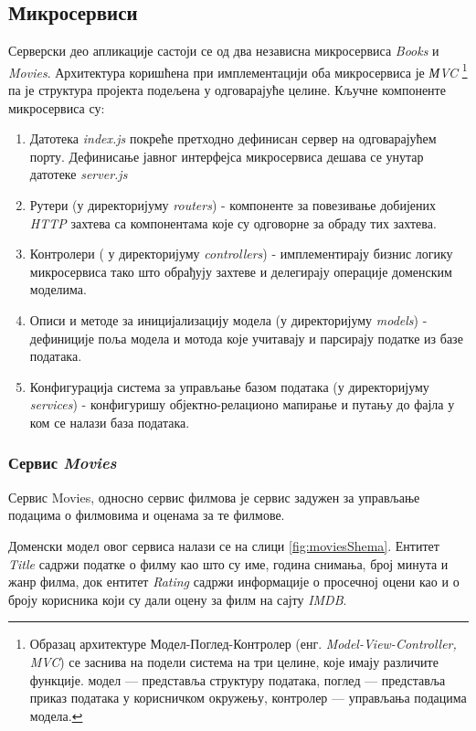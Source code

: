 \documentclass[12pt,oneside]{memoir}
\begin{document}
\subsection{Микросервиси}

Серверски део апликације састоји се од два независна микросервиса \textit{Books} и \textit{Movies}. Архитектура коришћена при имплементацији оба микросервиса је \textit{МVC} \footnote{Образац архитектуре Модел-Поглед-Контролер (енг. \textit{Model-View-Controller, MVC})
се заснива на подели система на три целине, које имају различите функције. модел — представља структуру података, поглед — представља приказ података у корисничком окружењу, контролер — управљања подацима модела.} па је структура пројекта подељена у одговарајуће целине.
Кључне компоненте микросервиса су:

\begin{enumerate}
\item Датотека \textit{index.js} покреће претходно дефинисан сервер на одговарајућем порту. Дефинисање јавног интерфејса микросервиса дешава се унутар датотеке \textit{server.js}
\item Рутери (у директоријуму \textit{routers}) - компоненте за повезивање добијених \textit{HTTP} захтева са компонентама које су одговорне за обраду тих захтева.
\item Контролери ( у директоријуму \textit{controllers}) - имплементирају бизнис логику микросервиса тако што обрађују захтеве и делегирају операције доменским моделима.
\item Описи и методе за иницијализацију модела (у директоријуму \textit{models}) -  дефиниције поља модела и мотода које учитавају и парсирају податке из базе података.
\item Конфигурација  система за управљање базом података (у директоријуму \textit{services}) - конфигуришу објектно-релационо мапирање и путању до фајла у ком се налази база података.
\end{enumerate}

\subsubsection{Сервис \textit{Movies}}

Сервис Movies, односно сервис филмова је сервис задужен за управљање подацима о филмовима и оценама за те филмове.

Доменски модел овог сервиса налази се на слици \ref{fig:moviesShema}. Ентитет \textit{Title} садржи податке о филму као што су име, година снимања, број минута и жанр филма, док ентитет \textit{Rating} садржи информације о просечној оцени као и о броју корисника који су дали оцену за филм на сајту \textit{IMDB}.
\end{document}
